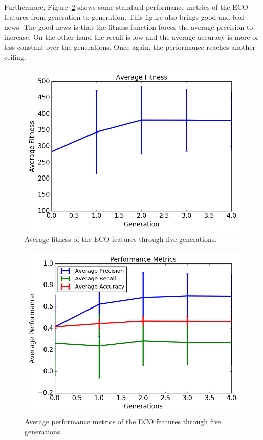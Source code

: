 \documentclass[conference]{IEEEtran}
\begin{document}
Furthermore, Figure~\ref{fig:metrics} shows some standard performance metrics of the ECO features from generation to generation. This figure also brings good and bad news. The good news is that the fitness function forces the average precision to increase. On the other hand the recall is low and the average accuracy is more or less constant over the generations. Once again, the performance reaches another ceiling.
\begin{figure}[t]
\centering
\includegraphics[width=\columnwidth]{average-fitness.png}
\caption{Average fitness of the ECO features through five generations.}
\label{fig:fitness}
\end{figure}
\begin{figure}[b]
\centering
\includegraphics[width=\columnwidth]{average-performance.png}
\caption{Average performance metrics of the ECO features through five generations.}
\label{fig:metrics}
\end{figure}
\end{document}
